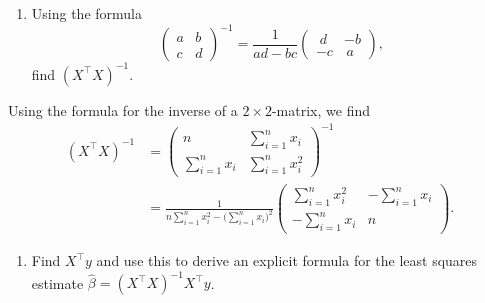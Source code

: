 \documentclass[
  a4paper,
]{article}
\providecommand{\tightlist}{%
  \setlength{\itemsep}{0pt}\setlength{\parskip}{0pt}}
\theoremstyle{definition}
\theoremstyle{definition}
\theoremstyle{definition}
\theoremstyle{definition}
\theoremstyle{remark}
\begin{document}
\begin{enumerate}
\def\labelenumi{\alph{enumi}.}
\setcounter{enumi}{1}
\tightlist
\item
  Using the formula
  \begin{equation*}
   \begin{pmatrix} a & b \\ c & d \end{pmatrix}^{-1}
   = \frac{1}{ad-bc} \begin{pmatrix} \;d & -b \\ -c & \,a \end{pmatrix},
      \end{equation*}
  find \((X^\top X)^{-1}\).
\end{enumerate}

\begin{myanswers}
Using the formula for the inverse of a \(2\times 2\)-matrix, we find
\begin{align*}
    (X^\top X)^{-1}
    &= \begin{pmatrix}
      n & \sum_{i=1}^n x_i \\
      \sum_{i=1}^n x_i & \sum_{i=1}^n x_i^2
    \end{pmatrix}^{-1} \\
    &= \frac{1}{n \sum_{i=1}^n x_i^2 - \bigl(\sum_{i=1}^n x_i\bigr)^2}
      \begin{pmatrix}
      \sum_{i=1}^n x_i^2 & -\sum_{i=1}^n x_i \\
      -\sum_{i=1}^n x_i & n
    \end{pmatrix}.
  \end{align*}

\end{myanswers}

\begin{enumerate}
\def\labelenumi{\alph{enumi}.}
\setcounter{enumi}{2}
\tightlist
\item
  Find \(X^\top y\) and use this to derive an explicit formula for
  the least squares estimate \(\hat\beta = (X^\top X)^{-1} X^\top y\).
\end{enumerate}
\end{document}
